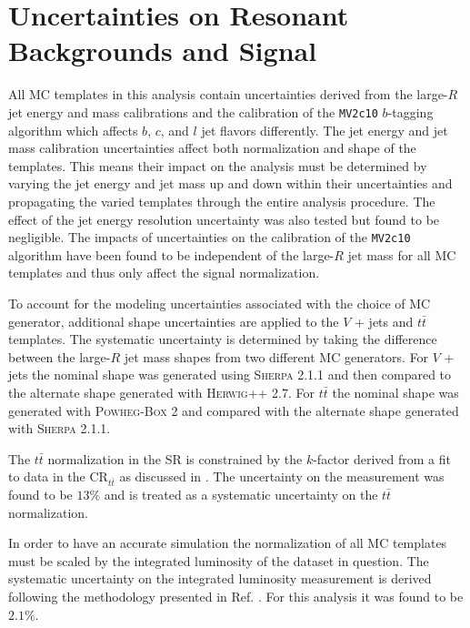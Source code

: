 \section{Uncertainties on Resonant Backgrounds and Signal} \label{sec:systematics:resonant_modeling}

All MC templates in this analysis contain uncertainties derived from the
large-$R$ jet energy and mass calibrations \cite{Aaboud:2018kfi} and the
calibration of the \texttt{MV2c10} $b$-tagging algorithm \cite{Aaboud:2018xwy}
which affects $b$, $c$, and $l$ jet flavors differently.  The jet energy and
jet mass calibration uncertainties affect both normalization and shape of the
templates.  This means their impact on the analysis must be determined by
varying the jet energy and jet mass up and down within their uncertainties and
propagating the varied templates through the entire analysis procedure.  The
effect of the jet energy resolution uncertainty was also tested but found to be
negligible. The impacts of uncertainties on the calibration of the
\texttt{MV2c10} algorithm have been found to be independent of the large-$R$
jet mass for all MC templates and thus only affect the signal normalization.

To account for the modeling uncertainties associated with the choice of MC
generator, additional shape uncertainties are applied to the $V$ + jets and
$t\bar{t}$ templates.  The systematic uncertainty is determined by taking the
difference between the large-$R$ jet mass shapes from two different MC
generators.  For $V$ + jets the nominal shape was generated using
\textsc{Sherpa} 2.1.1 and then compared to the alternate shape generated with
\textsc{Herwig}++ 2.7.  For $t\bar{t}$ the nominal shape was generated with
\textsc{Powheg-Box} 2 and compared with the alternate shape generated with
\textsc{Sherpa} 2.1.1.

The $t\bar{t}$ normalization in the SR is constrained by the $k$-factor derived
from a fit to data in the $\text{CR}_{t\bar{t}}$ as discussed in
.  The uncertainty on the measurement was found to
be $13\%$ and is treated as a systematic uncertainty on the $t\bar{t}$
normalization.

In order to have an accurate simulation the normalization of all MC templates
must be scaled by the integrated luminosity of the dataset in question.  The
systematic uncertainty on the integrated luminosity measurement is derived
following the methodology presented in Ref. \cite{Aad:2013ucp}.  For this
analysis it was found to be $2.1\%$.

